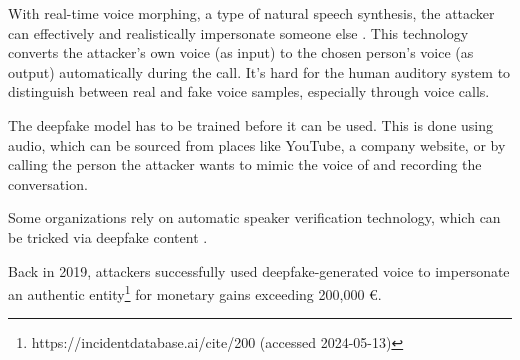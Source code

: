 With real-time voice morphing, a type of natural speech synthesis, the attacker can effectively and realistically impersonate someone else \citep{doanBTSEAudioDeepfakeDetectiong2023}. This technology converts the attacker's own voice (as input) to the chosen person's voice (as output) automatically during the call. It's hard for the human auditory system to distinguish between real and fake voice samples, especially through voice calls.

The deepfake model has to be trained before it can be used. This is done using audio, which can be sourced from places like YouTube, a company website, or by calling the person the attacker wants to mimic the voice of and recording the conversation.

Some organizations rely on automatic speaker verification technology, which can be tricked via deepfake content \citep{doanBTSEAudioDeepfakeDetectiong2023}.

Back in 2019, attackers successfully used deepfake-generated voice to impersonate an authentic entity\footnote{https://incidentdatabase.ai/cite/200 (accessed 2024-05-13)} for monetary gains exceeding 200,000 €.